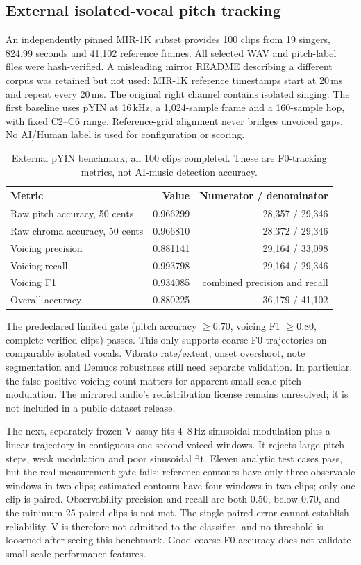 \subsection{External isolated-vocal pitch tracking}

An independently pinned MIR-1K subset provides 100 clips from 19 singers,
824.99 seconds and 41,102 reference frames. All selected WAV and pitch-label
files were hash-verified. A misleading mirror README describing a different
corpus was retained but not used: MIR-1K reference timestamps start at 20\,ms
and repeat every 20\,ms. The original right channel contains isolated singing.
The first baseline uses pYIN at 16\,kHz, a 1,024-sample frame and a 160-sample
hop, with fixed C2--C6 range. Reference-grid alignment never bridges unvoiced
gaps. No AI/Human label is used for configuration or scoring.

\begin{table}[htbp]
\centering\small
\caption{External pYIN benchmark; all 100 clips completed. These are F0-tracking
metrics, not AI-music detection accuracy.}
\label{tab:external-pyin-phenomena}
\begin{tabular}{lrr}
\toprule Metric & Value & Numerator / denominator \\
\midrule
Raw pitch accuracy, 50 cents & 0.966299 & 28,357 / 29,346 \\
Raw chroma accuracy, 50 cents & 0.966810 & 28,372 / 29,346 \\
Voicing precision & 0.881141 & 29,164 / 33,098 \\
Voicing recall & 0.993798 & 29,164 / 29,346 \\
Voicing F1 & 0.934085 & combined precision and recall \\
Overall accuracy & 0.880225 & 36,179 / 41,102 \\
\bottomrule
\end{tabular}
\end{table}

The predeclared limited gate (pitch accuracy $\geq0.70$, voicing F1 $\geq0.80$,
complete verified clips) passes. This only supports coarse F0 trajectories on
comparable isolated vocals. Vibrato rate/extent, onset overshoot, note segmentation
and Demucs robustness still need separate validation. In particular, the
false-positive voicing count matters for apparent small-scale pitch modulation.
The mirrored audio's redistribution license remains unresolved; it is not
included in a public dataset release.

The next, separately frozen V assay fits 4--8\,Hz sinusoidal modulation plus
a linear trajectory in contiguous one-second voiced windows. It rejects
large pitch steps, weak modulation and poor sinusoidal fit. Eleven analytic
test cases pass, but the real measurement gate fails: reference contours have
only three observable windows in two clips; estimated contours have four
windows in two clips; only one clip is paired. Observability precision and
recall are both 0.50, below 0.70, and the minimum 25 paired clips is not met.
The single paired error cannot establish reliability. V is therefore not
admitted to the classifier, and no threshold is loosened after seeing this
benchmark. Good coarse F0 accuracy does not validate small-scale performance
features.

